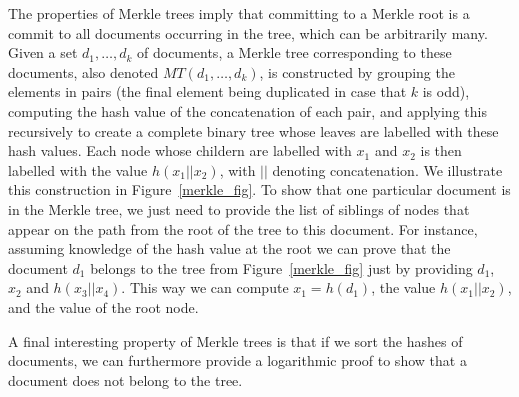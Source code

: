 The properties of Merkle trees imply that committing to a Merkle root is a commit to all documents occurring in the tree, which can be arbitrarily many. Given a set $d_1,\ldots ,d_k$ of documents, a Merkle tree corresponding to these documents, also denoted $MT(d_1,\ldots ,d_k)$, is constructed by grouping the elements in pairs (the final element being duplicated in case that $k$ is odd), computing the hash value of the concatenation of each pair, and applying this recursively to create a complete binary tree whose leaves are labelled with these hash values. Each node whose childern are labelled with $x_1$ and $x_2$ is then labelled with the value $h(x_1 || x_2)$, with $||$ denoting concatenation. We illustrate this construction in Figure~\ref{merkle_fig}. To show that one particular document is in the Merkle tree, we just need to provide the list of siblings of nodes that appear on the path from the root of the tree to this document. For instance, assuming knowledge of the hash value at the root we can prove that the document $d_1$ belongs to the tree from Figure~\ref{merkle_fig} just by providing $d_1$, $x_2$ and $h(x_3||x_4)$. This way we can compute $x_1=h(d_1)$, the value $h(x_1||x_2)$, and the value of the root node.

A final interesting property of Merkle trees is that if we sort the hashes of documents, we can furthermore provide a logarithmic proof to show that a document does not belong to the tree.

